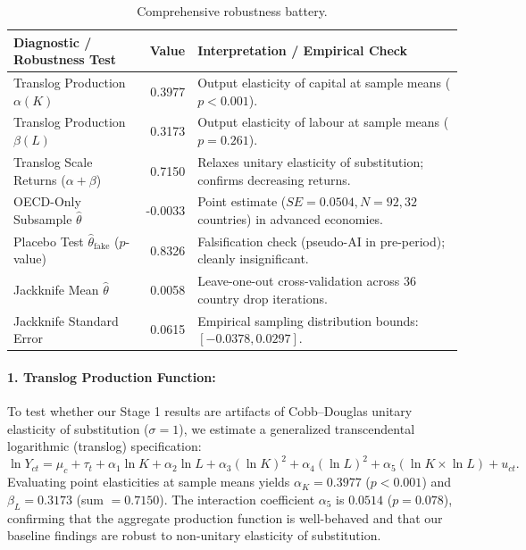 \documentclass[11pt,a4paper]{article}
\begin{document}
\begin{table}[!htbp]
\centering
\small
\begin{tabularx}{\textwidth}{@{}lrX@{}}
\toprule
\textbf{Diagnostic / Robustness Test} & \textbf{Value} & \textbf{Interpretation / Empirical Check} \\
\midrule
Translog Production $\alpha(K)$ & 0.3977 & Output elasticity of capital at sample means ($p < 0.001$). \\
Translog Production $\beta(L)$ & 0.3173 & Output elasticity of labour at sample means ($p = 0.261$). \\
Translog Scale Returns ($\alpha + \beta$) & 0.7150 & Relaxes unitary elasticity of substitution; confirms decreasing returns. \\
OECD-Only Subsample $\hat{\theta}$ & -0.0033 & Point estimate ($SE = 0.0504, N = 92, 32$ countries) in advanced economies. \\
Placebo Test $\hat{\theta}_{\text{fake}}$ ($p$-value) & 0.8326 & Falsification check (pseudo-AI in pre-period); cleanly insignificant. \\
Jackknife Mean $\hat{\theta}$ & 0.0058 & Leave-one-out cross-validation across 36 country drop iterations. \\
Jackknife Standard Error & 0.0615 & Empirical sampling distribution bounds: $[-0.0378, 0.0297]$. \\
\bottomrule
\end{tabularx}
\caption{Comprehensive robustness battery.}
\label{tab:robust}
\end{table}

\paragraph{1. Translog Production Function:} To test whether our Stage 1 results are artifacts of Cobb--Douglas unitary elasticity of substitution ($\sigma = 1$), we estimate a generalized transcendental logarithmic (translog) specification:
\begin{equation}
    \ln Y_{ct} = \mu_c + \tau_t + \alpha_1 \ln K + \alpha_2 \ln L + \alpha_3 (\ln K)^2 + \alpha_4 (\ln L)^2 + \alpha_5 (\ln K \times \ln L) + u_{ct}.
\end{equation}
Evaluating point elasticities at sample means yields $\alpha_K = 0.3977$ ($p < 0.001$) and $\beta_L = 0.3173$ (sum $= 0.7150$). The interaction coefficient $\alpha_5$ is $0.0514$ ($p = 0.078$), confirming that the aggregate production function is well-behaved and that our baseline findings are robust to non-unitary elasticity of substitution.
\end{document}
